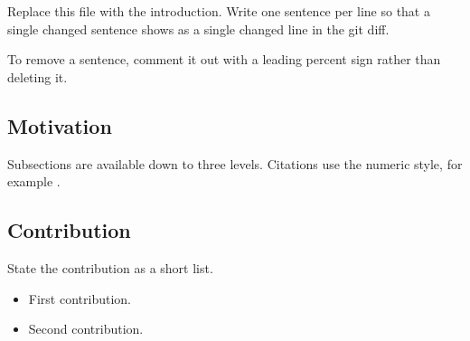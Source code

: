 Replace this file with the introduction.
Write one sentence per line so that a single changed sentence shows as a single changed line in the git diff.

To remove a sentence, comment it out with a leading percent sign rather than deleting it.

\subsection{Motivation}
Subsections are available down to three levels.
Citations use the numeric style, for example \citep{example2026}.

\subsection{Contribution}
State the contribution as a short list.
\begin{itemize}
  \item First contribution.
  \item Second contribution.
\end{itemize}
